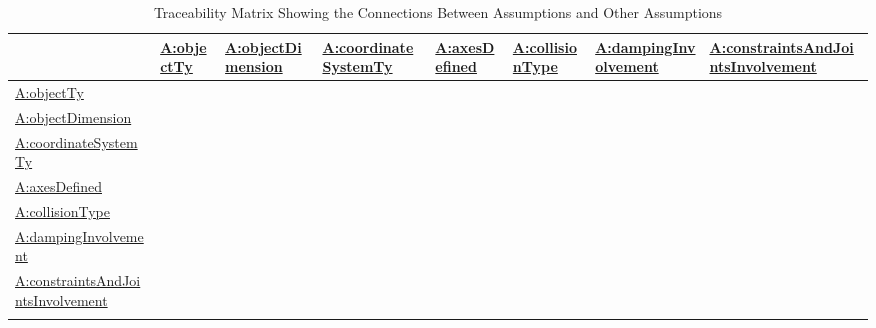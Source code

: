 \documentclass[12pt]{article}
\begin{document}
\begin{longtable}{l l l l l l l l}
\toprule
\textbf{} & \textbf{\hyperref[assumpOT]{A:objectTy}} & \textbf{\hyperref[assumpOD]{A:objectDimension}} & \textbf{\hyperref[assumpCST]{A:coordinateSystemTy}} & \textbf{\hyperref[assumpAD]{A:axesDefined}} & \textbf{\hyperref[assumpCT]{A:collisionType}} & \textbf{\hyperref[assumpDI]{A:dampingInvolvement}} & \textbf{\hyperref[assumpCAJI]{A:constraintsAndJointsInvolvement}}
\\
\midrule
\endhead
\hyperref[assumpOT]{A:objectTy} &  &  &  &  &  &  & 
\\
\hyperref[assumpOD]{A:objectDimension} &  &  &  &  &  &  & 
\\
\hyperref[assumpCST]{A:coordinateSystemTy} &  &  &  &  &  &  & 
\\
\hyperref[assumpAD]{A:axesDefined} &  &  &  &  &  &  & 
\\
\hyperref[assumpCT]{A:collisionType} &  &  &  &  &  &  & 
\\
\hyperref[assumpDI]{A:dampingInvolvement} &  &  &  &  &  &  & 
\\
\hyperref[assumpCAJI]{A:constraintsAndJointsInvolvement} &  &  &  &  &  &  & 
\\
\bottomrule
\caption{Traceability Matrix Showing the Connections Between Assumptions and Other Assumptions}
\label{Table:TraceMatAvsA}
\end{longtable}
\end{document}

